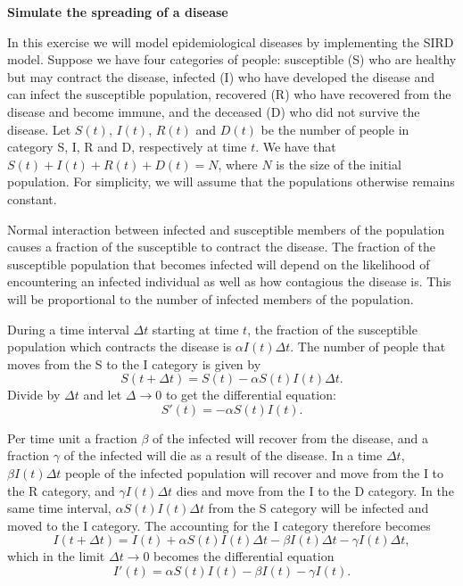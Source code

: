 \begin{Problem}{\textbf{Simulate the spreading of a disease}}\label{bjorgvin}

\noindent
In this exercise we will model epidemiological diseases by implementing the SIRD model. Suppose we have four categories of people: susceptible (S) who are healthy but may contract the disease, infected (I) who have developed the disease and can infect the susceptible population, recovered (R) who have recovered from the disease and become immune, and the deceased (D) who did not survive the disease. Let $S(t)$, $I(t)$, $R(t)$ and $D(t)$ be the number of people in category S, I, R and D, respectively at time $t$. We have that $S(t) + I(t) + R(t) + D(t) = N$, where $N$ is the size of the initial population. For simplicity, we will assume that the populations otherwise remains constant.

Normal interaction between infected and susceptible members of the population causes a fraction of the susceptible to contract the disease. The fraction of the susceptible population that becomes infected will depend on the likelihood of encountering an infected individual as well as how contagious the disease is. This will be proportional to the number of infected members of the population.

During a time interval $\Delta t$ starting at time $t$, the fraction of the susceptible population which contracts the disease is $\alpha I (t) \Delta t$. The number of people that moves from the S to the I category is given by
\begin{equation*}
    S(t+\Delta t) = S(t) - \alpha S(t)I(t)\Delta t.
\end{equation*}
Divide by $\Delta t$ and let $\Delta \rightarrow 0$ to get the differential equation:
\begin{equation} \label{eq:1}
S'(t)=-\alpha S(t) I(t).
\end{equation}

Per time unit a fraction $\beta$ of the infected will recover from the disease, and  a fraction $\gamma$ of the infected will die as a result of the disease. In a time $\Delta t$, $\beta I(t) \Delta t$ people of the infected population will recover and move from the I to the R category, and $\gamma I(t) \Delta t$ dies and move from the I to the D category. In the same time interval, $\alpha S(t)I(t)\Delta t$ from the S category will be infected and moved to the I category. The accounting for the I category therefore becomes
\begin{equation*}
I(t+\Delta t) = I(t) + \alpha S (t) I(t) \Delta t - \beta I(t)\Delta t - \gamma I(t) \Delta t,
\end{equation*}
which in the limit $\Delta t \rightarrow 0$ becomes the differential equation
\begin{equation} \label{eq:2}
I'(t) = \alpha S(t) I(t) - \beta I(t) - \gamma I(t) .
\end{equation}


\end{Problem}
